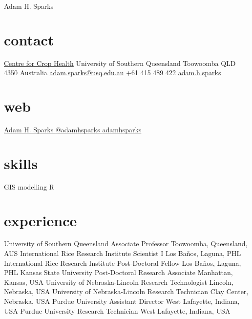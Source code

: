 
\hfill {\Huge Adam H. Sparks}

\begin{aside}
\small{\section{contact}}
\small{\href{http://www.usq.edu.au/research/research-at-usq/institutes-centres/cch}{Centre for Crop Health}}
\small{University of Southern Queensland}
\small{Toowoomba QLD 4350}
\small{Australia}
\small{\href{mailto:adam.sparks@usq.edu.au}{adam.sparks@usq.edu.au}}
\small{+61 415 489 422 \faMobilePhone{}}
\small{{\href{skype:adam.h.sparks?call}{adam.h.sparks }}}
\section{web}
\small{\href{https://ph.linkedin.com/pub/adam-sparks/8b/b96/507}{Adam H. Sparks {\color{linkedin}\FA {}}}}
\small{\href{https://www.twitter.com/adamhsparks/}{@adamhsparks {\color{twitter.blue}\FA {}}}}
\small{\href{https://github.com/adamhsparks/}{adamhsparks \FA {}}}
\small{\section{skills}}
\small{GIS}
\small{modelling}
\small{R}
\end{aside}

\section*{experience}
\begin{entrylist}
    {University of Southern Queensland}
    {Associate Professor}
    {Toowoomba, Queensland, AUS}
    {International Rice Research Institute}
    {Scientist I}
    {Los Ba\~nos, Laguna, PHL}
    {International Rice Research Institute}
    {Post-Doctoral Fellow}
    {Los Ba\~nos, Laguna, PHL}
    {Kansas State University}
    {Post-Doctoral Research Associate}
    {Manhattan, Kansas, USA}
   {University of Nebraska-Lincoln}
   {Research Technologist}
   {Lincoln, Nebraska, USA}
   {University of Nebraska-Lincoln}
   {Research Technician}
   {Clay Center, Nebraska, USA}
   {Purdue University}
   {Assistant Director}
   {West Lafayette, Indiana, USA}
   {Purdue University}
   {Research Technician}
   {West Lafayette, Indiana, USA}
\end{entrylist}

